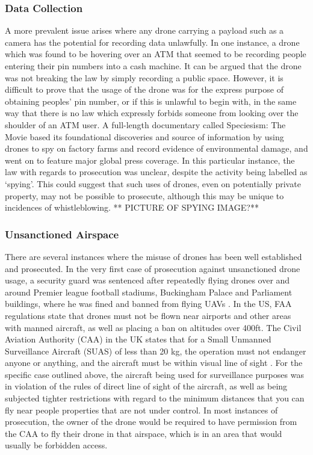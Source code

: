 \subsubsection{Data Collection}
A more prevalent issue arises where any drone carrying a payload such as a camera has the potential for recording data unlawfully. In one instance, a drone which was found to be hovering over an ATM that seemed to be recording people entering their pin numbers into a cash machine. It can be argued that the drone was not breaking the law by simply recording a public space\cite{maryannrusson2015}. However, it is difficult to prove that the usage of the drone was for the express purpose of obtaining peoples’ pin number, or if this is unlawful to begin with, in the same way that there is no law which expressly forbids someone from looking over the shoulder of an ATM user.
A full-length documentary called Speciesism: The Movie based its foundational discoveries and source of information by using drones to spy on factory farms and record evidence of environmental damage, and went on to feature major global press coverage. In this particular instance, the law with regards to prosecution was unclear, despite the activity being labelled as ‘spying’. This could suggest that such uses of drones, even on potentially private property, may not be possible to prosecute, although this may be unique to incidences of whistleblowing.
** PICTURE OF SPYING IMAGE?**

\subsubsection{Unsanctioned Airspace}
There are several instances where the misuse of drones has been well established and prosecuted. In the very first case of prosecution against unsanctioned drone usage, a security guard was sentenced after repeatedly flying drones over and around Premier league football stadiums, Buckingham Palace and Parliament buildings, where he was fined and banned from flying UAVs \cite{maryannrusson2015}.  In the US, FAA regulations state that drones must not be flown near airports and other areas with manned aircraft, as well as placing a ban on altitudes over 400ft. The Civil Aviation Authority (CAA) in the UK states that for a Small Unmanned Surveillance Aircraft (SUAS) of less than 20 kg, the operation must not endanger anyone or anything, and the aircraft must be within visual line of sight \cite{civilaviationauthority2015}.
For the specific case outlined above, the aircraft being used for surveillance purposes was in violation of the rules of direct line of sight of the aircraft, as well as being subjected tighter restrictions with regard to the minimum distances that you can fly near people properties that are not under control. In most instances of prosecution, the owner of the drone would be required to have permission from the CAA to fly their drone in that airspace, which is in an area that would usually be forbidden access.

